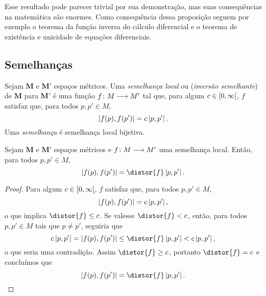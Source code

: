Esse resultado pode parecer trivial por sua demonstração, mas suas consequências na matemática são enormes. Como consequência dessa proposição seguem por exemplo o teorema da função inversa do cálculo diferencial e o teorema de existência e unicidade de equações diferenciais.



















\subsection{Semelhanças}

\begin{definition}
Sejam $\bm{M}$ e $\bm{M'}$ espaços métricos. Uma \emph{semelhança local} ou (\emph{imersão semelhante}) de $\bm{M}$ para $\bm{M'}$ é uma função ${f}\colon {M} \longrightarrow {M'}$ tal que, para algum $c \in \left[{0},{\infty}\right[$, $f$ satisfaz que, para todos $p,p' \in M$,
	\begin{equation*}
	\left\vert{f(p)},{f(p')}\right\vert = c \left\vert{p},{p'}\right\vert.
	\end{equation*}
Uma \emph{semelhança} é semelhança local bijetiva.
\end{definition}

\begin{proposition}
Sejam $\bm{M}$ e $\bm{M'}$ espaços métricos e ${f}\colon {M} \longrightarrow {M'}$ uma semelhança local. Então, para todos $p,p' \in M$,
	\begin{equation*}
	\dist{f(p)}{f(p')} = \distor{f} \dist{p}{p'}.
	\end{equation*}
\end{proposition}
\begin{proof}
Para algum $c \in \left[{0},{\infty}\right[$, $f$ satisfaz que, para todos $p,p' \in M$,
	\begin{equation*}
	\left\vert{f(p)},{f(p')}\right\vert = c \left\vert{p},{p'}\right\vert,
	\end{equation*}
o que implica $\distor{f} \leq c$. Se valesse $\distor{f}<c$, então, para todos $p,p' \in M$ tais que $p \neq p'$, seguiria que
	\begin{equation*}
	c \dist{p}{p'} = \dist{f(p)}{f(p')} \leq \distor{f}\dist{p}{p'} < c \dist{p}{p'},
	\end{equation*}
o que seria uma contradição. Assim $\distor{f} \geq c$, portanto $\distor{f}=c$ e concluímos que
	\begin{equation*}
	\dist{f(p)}{f(p')} = \distor{f} \dist{p}{p'}.
	\qedhere
	\end{equation*}
\end{proof}

